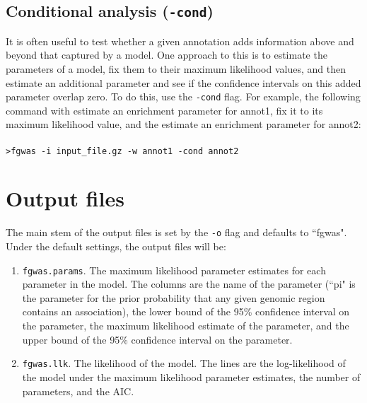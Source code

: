\documentclass[11pt,titlepage]{article}
\begin{document}
\subsection{Conditional analysis (\texttt{-cond})}
It is often useful to test whether a given annotation adds information above and beyond that captured by a model. One approach to this is to estimate the parameters of a model, fix them to their maximum likelihood values, and then estimate an additional parameter and see if the confidence intervals on this added parameter overlap zero. To do this, use the \texttt{-cond} flag. For example, the following command with estimate an enrichment parameter for annot1, fix it to its maximum likelihood value, and the estimate an enrichment parameter for annot2:
\\
\\
\texttt{>fgwas -i input\_file.gz -w annot1 -cond annot2}



\section{Output files}
The main stem of the output files is set by the \texttt{-o} flag and defaults to ``fgwas". Under the default settings, the output files will be:

\begin{enumerate}
\item \texttt{fgwas.params}. The maximum likelihood parameter estimates for each parameter in the model. The columns are the name of the parameter (``pi" is the parameter for the prior probability that any given genomic region contains an association), the lower bound of the 95\% confidence interval on the parameter, the maximum likelihood estimate of the parameter, and the upper bound of the 95\% confidence interval on the parameter.
\item \texttt{fgwas.llk}. The likelihood of the model. The lines are the log-likelihood of the model under the maximum likelihood parameter estimates, the number of parameters, and the AIC. 
\end{enumerate}
\end{document}
